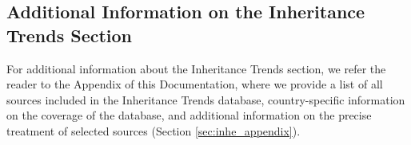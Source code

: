 \documentclass[
]{article}
\begin{document}
\subsection{Additional Information on the Inheritance Trends
Section}\label{additional-information-on-the-inheritance-trends-section}

For additional information about the Inheritance Trends section, we
refer the reader to the Appendix of this Documentation, where we provide
a list of all sources included in the Inheritance Trends database,
country-specific information on the coverage of the database, and
additional information on the precise treatment of selected sources
(Section \ref{sec:inhe_appendix}).

\printbibliography
\end{document}
